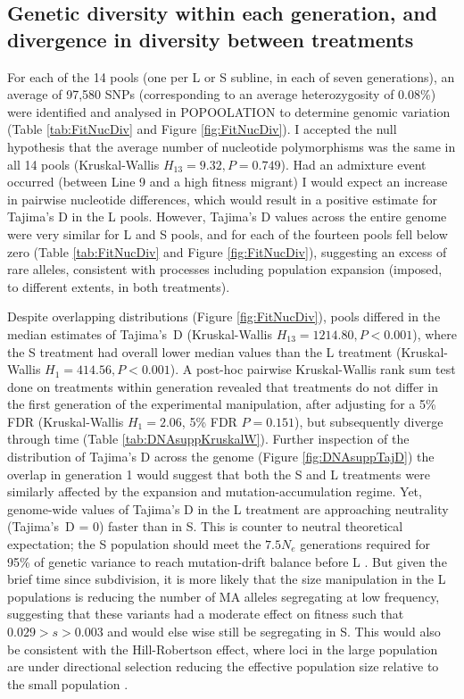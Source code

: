 \subsection{Genetic diversity within each generation, and divergence in diversity between treatments}
For each of the 14 pools (one per L or S subline, in each of seven generations), an average of 97,580 SNPs (corresponding to an average heterozygosity of 0.08\%) were identified and analysed in POPOOLATION to determine genomic variation (Table \ref{tab:FitNucDiv} and Figure \ref{fig:FitNucDiv}). I accepted the null hypothesis that the average number of nucleotide polymorphisms was the same in all 14 pools (Kruskal-Wallis $H_{13} = 9.32, P = 0.749$). Had an admixture event occurred (between Line 9 and a high fitness migrant) I would expect an increase in pairwise nucleotide differences, which would result in a positive estimate for Tajima’s D in the L pools. However, Tajima’s D values across the entire genome were very similar for L and S pools, and for each of the fourteen pools fell below zero (Table \ref{tab:FitNucDiv} and Figure \ref{fig:FitNucDiv}), suggesting an excess of rare alleles, consistent with processes including population expansion (imposed, to different extents, in both treatments).\par

Despite overlapping distributions (Figure \ref{fig:FitNucDiv}), pools differed in the median estimates of Tajima’s~D (Kruskal-Wallis $H_{13} = 1214.80, P < 0.001$), where the S treatment had overall lower median values than the L treatment (Kruskal-Wallis $H_1 = 414.56, P < 0.001$). A post-hoc pairwise Kruskal-Wallis rank sum test done on treatments within generation revealed that treatments do not differ in the first generation of the experimental manipulation, after adjusting for a 5\% FDR (Kruskal-Wallis $H_1 = 2.06$, 5\% FDR $P = 0.151$), but subsequently diverge through time (Table \ref{tab:DNAsuppKruskalW}). Further inspection of the distribution of Tajima’s D across the genome (Figure \ref{fig:DNAsuppTajD}) the overlap in generation 1 would suggest that both the S and L treatments were similarly affected by the expansion and mutation-accumulation regime. Yet, genome-wide values of Tajima’s D in the L treatment are approaching neutrality (Tajima’s~D = 0) faster than in S. This is counter to neutral theoretical expectation; the S population should meet the $7.5N_e$ generations required for 95\% of genetic variance to reach mutation-drift balance before L \citep{Lync86}. But given the brief time since subdivision, it is more likely that the size manipulation in the L populations is reducing the number of MA alleles segregating at low frequency, suggesting that these variants had a moderate effect on fitness such that $0.029 > s > 0.003$ and would else wise still be segregating in S. This would also be consistent with the Hill-Robertson effect, where loci in the large population are under directional selection reducing the effective population size relative to the small population \citep{Hill66}.\par


